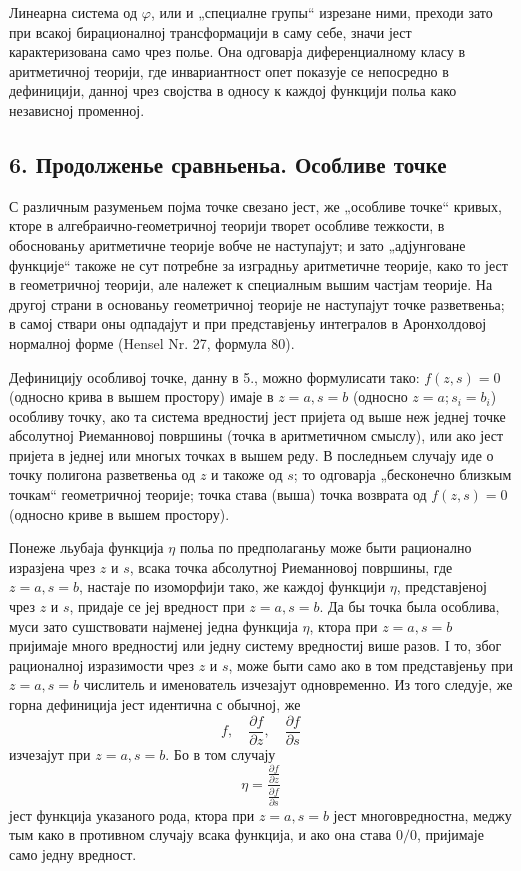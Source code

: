 ﻿\documentclass[11pt]{article}
\providecommand{\p}{\partial}
\begin{document}
Линеарна система од \(\varphi\), или и „специалне групы“ изрезане ними, преходи зато при всакој бирационалној трансформацији в саму себе, значи јест карактеризована само чрез полье. Она одговарја диференциалному класу в аритметичној теорији, где инвариантност опет показује се непосредно в дефиницији, данној чрез својства в односу к каждој функцији польа како независној променној.

\subsection*{6. Продолженье сравньеньа. Особливе точке}
С различным разуменьем појма точке свезано јест, же „особливе точке“ кривых, кторе в алгебраично-геометричној теорији творет особливе тежкости, в обоснованьу аритметичне теорије вобче не наступајут; и зато „адјунговане функције“ такоже не сут потребне за изградньу аритметичне теорије, како то јест в геометричној теорији, але належет к специалным вышим частјам теорије. На другој страни в основаньу геометричној теорије не наступајут точке разветвеньа; в самој ствари оны одпадајут и при представјеньу интегралов в Аронхолдовој нормалној форме (Hensel Nr. 27, формула 80).

Дефиницију особливој точке, данну в 5., можно формулисати тако: \(f(z,s)=0\) (односно крива в вышем простору) имаје в \(z=a,s=b\) (односно \(z=a; s_i=b_i\)) особливу точку, ако та система вредностиј јест пријета од выше неж једнеј точке абсолутној Риеманновој површины (точка в аритметичном смыслу), или ако јест пријета в једнеј или многых точках в вышем реду. В последньем случају иде о точку полигона разветвеньа од \(z\) и такоже од \(s\); то одговарја „бесконечно близкым точкам“ геометричној теорије; точка става (выша) точка возврата од \(f(z,s)=0\) (односно криве в вышем простору).

Понеже льубаја функција \(\eta\) польа по предполаганьу може быти рационално изразјена чрез \(z\) и \(s\), всака точка абсолутној Риеманновој површины, где \(z=a,s=b\), настаје по изоморфији тако, же каждој функцији \(\eta\), представјеној чрез \(z\) и \(s\), придаје се јеј вредност при \(z=a,s=b\). Да бы точка была особлива, муси зато сушствовати најменеј једна функција \(\eta\), ктора при \(z=a,s=b\) пријимаје много вредностиј или једну систему вредностиј више разов. I то, због рационалној изразимости чрез \(z\) и \(s\), може быти само ако в том представјеньу при \(z=a,s=b\) числитель и именователь изчезајут одновременно. Из того следује, же горна дефиниција јест идентична с обычној, же
\[
f,\quad \frac{\p f}{\p z},\quad \frac{\p f}{\p s}
\]
изчезајут при \(z=a,s=b\). Бо в том случају
\[
\eta=\frac{\frac{\p f}{\p z}}{\frac{\p f}{\p s}}
\]
јест функција указаного рода, ктора при \(z=a,s=b\) јест многовредностна, меджу тым како в противном случају всака функција, и ако она става \(0/0\), пријимаје само једну вредност.
\end{document}
